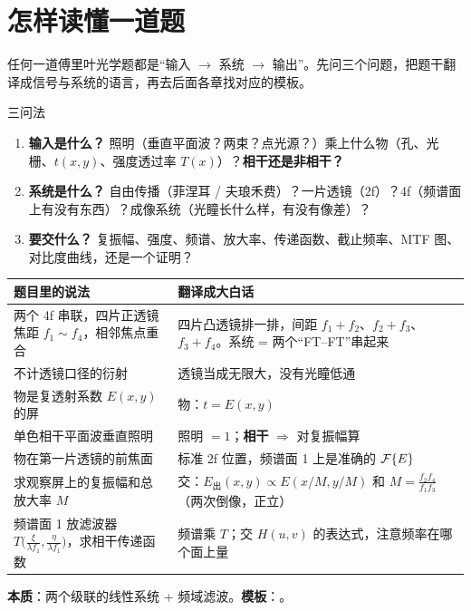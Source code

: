 \section{怎样读懂一道题}\label{sec:p-read}

\begin{idea}[一句话]
任何一道傅里叶光学题都是“输入 $\to$ 系统 $\to$ 输出”。先问三个问题，把题干翻译成信号与系统的语言，再去后面各章找对应的模板。
\end{idea}

\begin{recipe}{三问法}
\begin{enumerate}
\item \textbf{输入是什么？} 照明（垂直平面波？两束？点光源？）乘上什么物（孔、光栅、$t(x,y)$、强度透过率 $T(x)$）？\textbf{相干还是非相干？}
\item \textbf{系统是什么？} 自由传播（菲涅耳 / 夫琅禾费）？一片透镜（2f）？4f（频谱面上有没有东西）？成像系统（光瞳长什么样，有没有像差）？
\item \textbf{要交什么？} 复振幅、强度、频谱、放大率、传递函数、截止频率、MTF 图、对比度曲线，还是一个证明？
\end{enumerate}
\end{recipe}

\begin{center}\small\renewcommand{\arraystretch}{1.3}
\begin{tabular}{@{}P{5.6cm}P{9.8cm}@{}}
\toprule
题目里的说法 & 翻译成大白话\\ \midrule
两个 4f 串联，四片正透镜焦距 $f_1\sim f_4$，相邻焦点重合 & 四片凸透镜排一排，间距 $f_1+f_2$、$f_2+f_3$、$f_3+f_4$。系统 = 两个“FT–FT”串起来\\
不计透镜口径的衍射 & 透镜当成无限大，没有光瞳低通\\
物是复透射系数 $E(x,y)$ 的屏 & 物：$t=E(x,y)$\\
单色相干平面波垂直照明 & 照明 $=1$；\textbf{相干} $\Rightarrow$ 对复振幅算\\
物在第一片透镜的前焦面 & 标准 2f 位置，频谱面 1 上是准确的 $\mathcal{F}\{E\}$\\
求观察屏上的复振幅和总放大率 $M$ & 交：$E_{\text{出}}(x,y)\propto E(x/M,y/M)$ 和 $M=\frac{f_2f_4}{f_1f_3}$（两次倒像，正立）\\
频谱面 1 放滤波器 $T\big(\frac{\xi}{\lambda f_1},\frac{\eta}{\lambda f_1}\big)$，求相干传递函数 & 频谱乘 $T$；交 $H(u,v)$ 的表达式，注意频率在哪个面上量\\
\bottomrule
\end{tabular}
\end{center}
\textbf{本质}：两个级联的线性系统 + 频域滤波。\textbf{模板}：\pageref{ex:v-4f2}。

